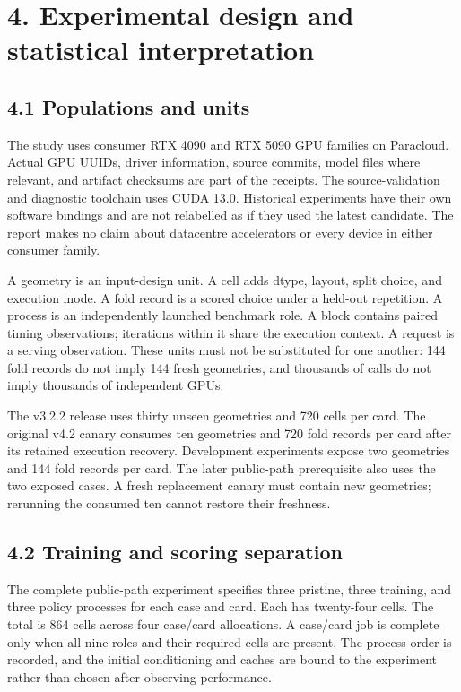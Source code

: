 \documentclass[11pt,a4paper]{article}
\begin{document}
\clearpage

\section*{4. Experimental design and statistical interpretation}


\subsection*{4.1 Populations and units}

The study uses consumer RTX 4090 and RTX 5090 GPU families on Paracloud. Actual GPU UUIDs, driver information, source commits, model files where relevant, and artifact checksums are part of the receipts. The source-validation and diagnostic toolchain uses CUDA 13.0. Historical experiments have their own software bindings and are not relabelled as if they used the latest candidate. The report makes no claim about datacentre accelerators or every device in either consumer family.


A geometry is an input-design unit. A cell adds dtype, layout, split choice, and execution mode. A fold record is a scored choice under a held-out repetition. A process is an independently launched benchmark role. A block contains paired timing observations; iterations within it share the execution context. A request is a serving observation. These units must not be substituted for one another: 144 fold records do not imply 144 fresh geometries, and thousands of calls do not imply thousands of independent GPUs.


The v3.2.2 release uses thirty unseen geometries and 720 cells per card. The original v4.2 canary consumes ten geometries and 720 fold records per card after its retained execution recovery. Development experiments expose two geometries and 144 fold records per card. The later public-path prerequisite also uses the two exposed cases. A fresh replacement canary must contain new geometries; rerunning the consumed ten cannot restore their freshness.


\subsection*{4.2 Training and scoring separation}

The complete public-path experiment specifies three pristine, three training, and three policy processes for each case and card. Each has twenty-four cells. The total is 864 cells across four case/\allowbreak{}card allocations. A case/\allowbreak{}card job is complete only when all nine roles and their required cells are present. The process order is recorded, and the initial conditioning and caches are bound to the experiment rather than chosen after observing performance.
\end{document}
